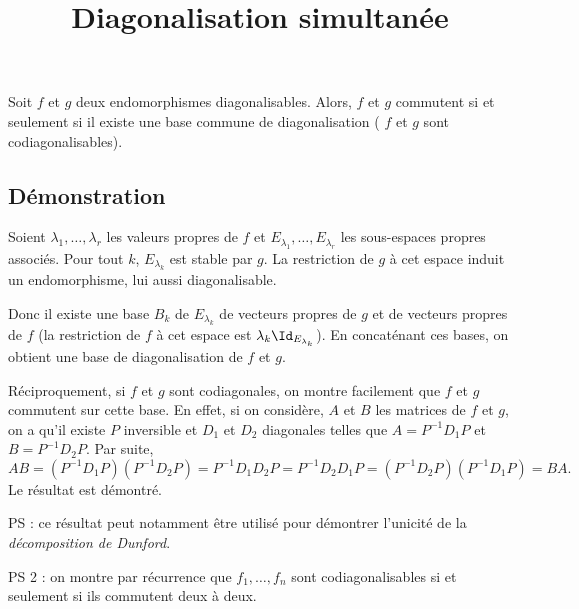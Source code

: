 \documentclass[fontsize=12pt,twoside=false,parskip=half, french]{scrartcl}
\title{Diagonalisation simultanée}
\date{}
\author{}
\begin{document}
\maketitle
   \begin{Theoreme}
      Soit $f$ et $g$ deux endomorphismes diagonalisables. Alors, $f$ et $g$ commutent si et seulement si il existe une base commune de diagonalisation (\ie{} $f$ et $g$ sont codiagonalisables). 
   \end{Theoreme}
   \subsection{Démonstration}
      Soient $\lambda_1, \ldots, \lambda_r$ les valeurs propres de $f$ et $E_{\lambda_1}, \ldots, E_{\lambda_r}$ 
      les sous-espaces propres associés. Pour tout $k$, $E_{\lambda_k}$ est stable par $g$. La restriction
      de $g$ à cet espace induit un endomorphisme, lui aussi diagonalisable. 
      
      Donc il existe une base $B_k$ de $E_{\lambda_k}$ de vecteurs propres de $g$ et de vecteurs propres de $f$ 
      (la restriction de $f$ à cet espace est $\lambda_k \Id_{E_{\lambda_k}}$). En concaténant ces bases, on obtient une base de diagonalisation de $f$ et $g$.
      
      Réciproquement, si $f$ et $g$ sont codiagonales, on montre facilement que $f$ et $g$ commutent sur cette
      base. En effet, si on considère, $A$ et $B$ les matrices de $f$ et $g$, on a qu’il existe $P$ inversible
      et $D_1$ et $D_2$ diagonales telles que $A = P^{-1}D_1P$ et $B = P^{-1}D_2P$. Par suite,
      \[
         AB = (P^{-1}D_1P)(P^{-1}D_2P) = P^{-1}D_1D_2P = P^{-1}D_2D_1P = (P^{-1}D_2P)(P^{-1}D_1P) = BA.
      \]
      Le résultat est démontré.
      
      PS : ce résultat peut notamment être utilisé pour démontrer l’unicité de la \emph{décomposition de Dunford}.
      
      PS 2 : on montre par récurrence que $f_1, \ldots, f_n$ sont codiagonalisables si et seulement si ils commutent deux à deux.
\end{document}
